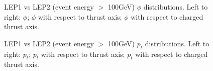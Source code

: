 \begin{figure}[H]
\centering
{}\hfill
{}\hfill
{}\hfill
\caption{LEP1 vs LEP2 (event energy $>$ 100GeV) $\phi$ distributions. Left to right: $\phi$; $\phi$ with respect to thrust axis; $\phi$ with respect to charged thrust axis.}
\end{figure}

\begin{figure}[H]
\centering
{}\hfill
{}\hfill
{}\hfill
\caption{LEP1 vs LEP2 (event energy $>$ 100GeV) $p_t$ distributions. Left to right: $p_t$; $p_t$ with respect to thrust axis; $p_t$ with respect to charged thrust axis.}
\end{figure}

